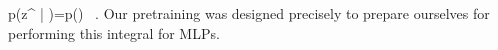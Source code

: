 \be\label{eq:gigantic-beast-that-we-tame-with-Dirac}
p\!\le(z^{} \Big| \D \ri)=\int \le[  \prod_{\mu=1}^{P} d \theta_{\mu}\ri]  p(\theta) \le[ \prod_{i=1}^{n_{\text{out}}}\prod_{\alpha\in\D}\delta\Big(z^{\text{out}}_{i;\alpha}-f_i(x_{\alpha};\theta)\Big)\ri] \, .
\ee
Our pretraining was designed precisely to prepare ourselves for performing this integral for MLPs.

















































